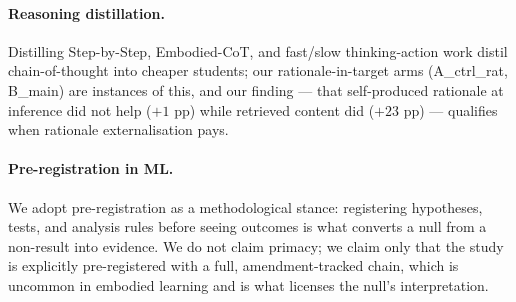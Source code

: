 \paragraph{Reasoning distillation.} Distilling Step-by-Step, Embodied-CoT, and
fast/slow thinking-action work distil chain-of-thought into cheaper
students; our rationale-in-target arms (A\_ctrl\_rat, B\_main) are
instances of this, and our finding --- that self-produced rationale at
inference did not help ($+1$ pp) while retrieved content did ($+23$ pp) ---
qualifies when rationale externalisation pays.

\paragraph{Pre-registration in ML.} We adopt pre-registration  as a methodological stance: registering hypotheses,
tests, and analysis rules before seeing outcomes is what converts a
null from a non-result into evidence. We do not claim primacy; we claim
only that the study is explicitly pre-registered with a full,
amendment-tracked chain, which is uncommon in embodied learning and is
what licenses the null's interpretation.
